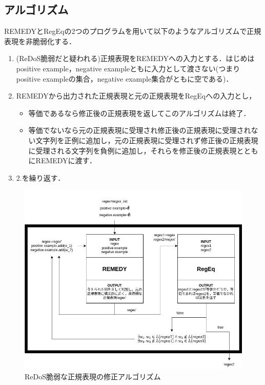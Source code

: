\documentclass[a4paper, 12pt, dvipdfmx, uplatex]{jsreport}
\begin{document}
\subsection{アルゴリズム}
REMEDYとRegEqの2つのプログラムを用いて以下のようなアルゴリズムで正規表現を非脆弱化する．
\begin{enumerate}
  \item (ReDoS脆弱だと疑われる)正規表現をREMEDYへの入力とする．はじめはpositive example，negative exampleともに入力として渡さない(つまりpositive exampleの集合，negative example集合がともに空である)．
  \item REMEDYから出力された正規表現と元の正規表現をRegEqへの入力とし，
  \begin{itemize}
    \item 等価であるなら修正後の正規表現を返してこのアルゴリズムは終了．
    \item 等価でないなら元の正規表現に受理され修正後の正規表現に受理されない文字列を正例に追加し，元の正規表現に受理されず修正後の正規表現に受理される文字列を負例に追加し，それらを修正後の正規表現とともにREMEDYに渡す．
  \end{itemize}
  \item 2.を繰り返す．
\end{enumerate}

\begin{figure}[H] %
  \centering
  \includegraphics[width=\linewidth]{../figures/algorithm.jpg}
  \caption{ReDoS脆弱な正規表現の修正アルゴリズム\label{repair}}
\end{figure}









\end{document}
